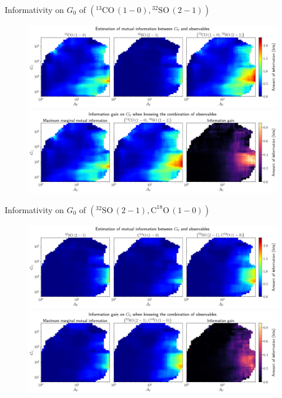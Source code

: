 \documentclass{beamer}
\begin{document}
\begin{frame}{Informativity on $G_0$ of $\left(\mathrm{^{13}CO\,(1-0)},\mathrm{^{32}SO\,(2-1)}\right)$}
    \begin{figure}
        \centering
        \includegraphics[width=0.95\linewidth]{../mi/g0__13co10_32so21_mi.png}
        \vfill
        \includegraphics[width=0.95\linewidth]{../mi/g0__13co10_32so21_mi_gain.png}
    \end{figure}
\end{frame}

\begin{frame}{Informativity on $G_0$ of $\left(\mathrm{^{32}SO\,(2-1)},\mathrm{C^{18}O\,(1-0)}\right)$}
    \begin{figure}
        \centering
        \includegraphics[width=0.95\linewidth]{../mi/g0__32so21_c18o10_mi.png}
        \vfill
        \includegraphics[width=0.95\linewidth]{../mi/g0__32so21_c18o10_mi_gain.png}
    \end{figure}
\end{frame}
\end{document}
